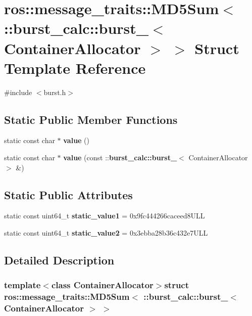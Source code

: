 \section{ros\-:\-:message\-\_\-traits\-:\-:\-M\-D5\-Sum$<$ \-:\-:burst\-\_\-calc\-:\-:burst\-\_\-$<$ \-Container\-Allocator $>$ $>$ \-Struct \-Template \-Reference}
\label{structros_1_1message__traits_1_1MD5Sum_3_01_1_1burst__calc_1_1burst___3_01ContainerAllocator_01_4_01_4}


{\ttfamily \#include $<$burst.\-h$>$}

\subsection*{\-Static \-Public \-Member \-Functions}
\begin{DoxyCompactItemize}
\item 
static const char $\ast$ {\bf value} ()
\item 
static const char $\ast$ {\bf value} (const \-::{\bf burst\-\_\-calc\-::burst\-\_\-}$<$ \-Container\-Allocator $>$ \&)
\end{DoxyCompactItemize}
\subsection*{\-Static \-Public \-Attributes}
\begin{DoxyCompactItemize}
\item 
static const uint64\-\_\-t {\bf static\-\_\-value1} = 0x9fc444266caceed8\-U\-L\-L
\item 
static const uint64\-\_\-t {\bf static\-\_\-value2} = 0x3ebba28b36c432e7\-U\-L\-L
\end{DoxyCompactItemize}


\subsection{\-Detailed \-Description}
\subsubsection*{template$<$class Container\-Allocator$>$struct ros\-::message\-\_\-traits\-::\-M\-D5\-Sum$<$ \-::burst\-\_\-calc\-::burst\-\_\-$<$ Container\-Allocator $>$ $>$}



